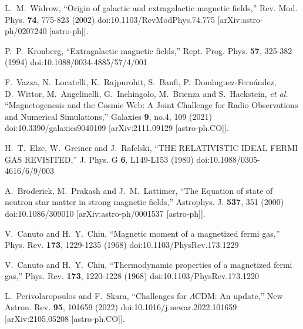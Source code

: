 \documentclass[universe,article,submit,moreauthors,pdftex,a4paper]{Definitions/mdpi}
\begin{document}
\begin{thebibliography}{99}
L.~M.~Widrow,
``Origin of galactic and extragalactic magnetic fields,''
Rev. Mod. Phys. \textbf{74}, 775-823 (2002)
doi:10.1103/RevModPhys.74.775
[arXiv:astro-ph/0207240 [astro-ph]].

P.~P.~Kronberg,
``Extragalactic magnetic fields,''
Rept. Prog. Phys. \textbf{57}, 325-382 (1994)
doi:10.1088/0034-4885/57/4/001

F.~Vazza, N.~Locatelli, K.~Rajpurohit, S.~Banfi, P.~Dom\'\i{}nguez-Fern\'andez, D.~Wittor, M.~Angelinelli, G.~Inchingolo, M.~Brienza and S.~Hackstein, \textit{et al.}
``Magnetogenesis and the Cosmic Web: A Joint Challenge for Radio Observations and Numerical Simulations,''
Galaxies \textbf{9}, no.4, 109 (2021)
doi:10.3390/galaxies9040109
[arXiv:2111.09129 [astro-ph.CO]].

H.~T.~Elze, W.~Greiner and J.~Rafelski,
``THE RELATIVISTIC IDEAL FERMI GAS REVISITED,''
J. Phys. G \textbf{6}, L149-L153 (1980)
doi:10.1088/0305-4616/6/9/003

A.~Broderick, M.~Prakash and J.~M.~Lattimer,
``The Equation of state of neutron star matter in strong magnetic fields,''
Astrophys. J. \textbf{537}, 351 (2000)
doi:10.1086/309010
[arXiv:astro-ph/0001537 [astro-ph]].

V.~Canuto and H.~Y.~Chiu,
``Magnetic moment of a magnetized fermi gas,''
Phys. Rev. \textbf{173}, 1229-1235 (1968)
doi:10.1103/PhysRev.173.1229

V.~Canuto and H.~Y.~Chiu,
``Thermodynamic properties of a magnetized fermi gas,''
Phys. Rev. \textbf{173}, 1220-1228 (1968)
doi:10.1103/PhysRev.173.1220

L.~Perivolaropoulos and F.~Skara,
``Challenges for \ensuremath{\Lambda}CDM: An update,''
New Astron. Rev. \textbf{95}, 101659 (2022)
doi:10.1016/j.newar.2022.101659
[arXiv:2105.05208 [astro-ph.CO]].


\end{thebibliography}
\end{document}
